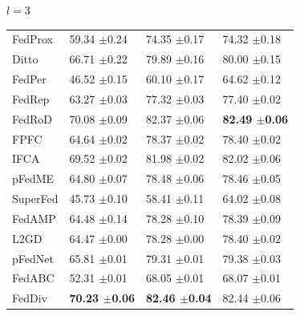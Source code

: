 \documentclass[journal]{IEEEtran}
\begin{document}
\begin{table}
\begin{subtable}[]{$l=3$}
\begin{tabular}{@{}llll@{}}
			FedProx  & 59.34 $\pm$0.24          & 74.35 $\pm$0.17          & 74.32 $\pm$0.18          \\
			Ditto    & 66.71 $\pm$0.22          & 79.89 $\pm$0.16          & 80.00 $\pm$0.15          \\
			FedPer   & 46.52 $\pm$0.15          & 60.10 $\pm$0.17          & 64.62 $\pm$0.12          \\
			FedRep   & 63.27 $\pm$0.03          & 77.32 $\pm$0.03          & 77.40 $\pm$0.02          \\
			FedRoD   & 70.08 $\pm$0.09          & 82.37 $\pm$0.06          & \textbf{82.49 $\pm$0.06}          \\
			FPFC     & 64.64 $\pm$0.02          & 78.37 $\pm$0.02          & 78.40 $\pm$0.02          \\
			IFCA     & 69.52 $\pm$0.02          & 81.98 $\pm$0.02          & 82.02 $\pm$0.06          \\
			pFedME   & 64.80 $\pm$0.07          & 78.48 $\pm$0.06          & 78.46 $\pm$0.05          \\
			SuperFed & 45.73 $\pm$0.10          & 58.41 $\pm$0.11          & 64.02 $\pm$0.08          \\
			FedAMP   & 64.48 $\pm$0.14          & 78.28 $\pm$0.10          & 78.39 $\pm$0.09          \\
			L2GD   & 64.47 $\pm$0.00          & 78.28 $\pm$0.00          & 78.40 $\pm$0.02          \\
			pFedNet  & 65.81 $\pm$0.01          & 79.31 $\pm$0.01          & 79.38 $\pm$0.03          \\
			FedABC   & 52.31 $\pm$0.01          & 68.05 $\pm$0.01          & 68.07 $\pm$0.01          \\
			FedDiv   & \textbf{70.23 $\pm$0.06} & \textbf{82.46 $\pm$0.04} & 82.44 $\pm$0.06 \\ \bottomrule
		\end{tabular}
	\end{subtable}
\end{table}
\end{document}
